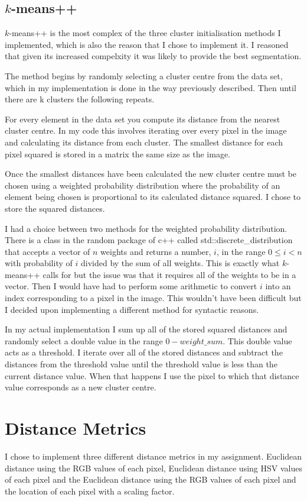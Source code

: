 \documentclass{article}
\begin{document}
\subsection{$k$-means++}

$k$-means++ is the most complex of the three cluster initialisation methods I implemented, which is also the reason that I chose to implement it. I reasoned that given its increased compelxity it was likely to provide the best segmentation.  

The method begins by randomly selecting a cluster centre from the data set, which in my implementation is done in the way previously described. Then until there are k clusters the following repeats. 

For every element in the data set you compute its distance from the nearest cluster centre. In my code this involves iterating over every pixel in the image and calculating its distance from each cluster. The smallest distance for each pixel squared is stored in a matrix the same size as the image.

Once the smallest distances have been calculated the new cluster centre must be chosen using a weighted probability distribution where the probability of an element being chosen is proportional to its calculated distance squared. I chose to store the squared distances.

I had a choice between two methods for the weighted probability distribution. There is a class in the random package of c++ called std::discrete\_distribution that accepts a vector of $n$ weights and returns a number, $i$, in the range $0 \leq i < n$ with probability of $i$ divided by the sum of all weights. This is exactly what $k$-means++ calls for but the issue was that it requires all of the weights to be in a vector. Then I would have had to perform some arithmetic to convert $i$ into an index corresponding to a pixel in the image. This wouldn't have been difficult but I decided upon implementing a different method for syntactic reasons. 

In my actual implementation I sum up all of the stored squared distances and randomly select a double value in the range $0-weight\_sum$. This double value acts as a threshold. I iterate over all of the stored distances and subtract the distances from the threshold value until the threshold value is less than the current distance value. When that happens I use the pixel to which that distance value corresponds as a new cluster centre. 

\section{Distance Metrics}
I chose to implement three different distance metrics in my assignment. Euclidean distance using the RGB values of each pixel, Euclidean distance using HSV values of each pixel and the Euclidean distance using the RGB values of each pixel and the location of each pixel with a scaling factor.
\end{document}
